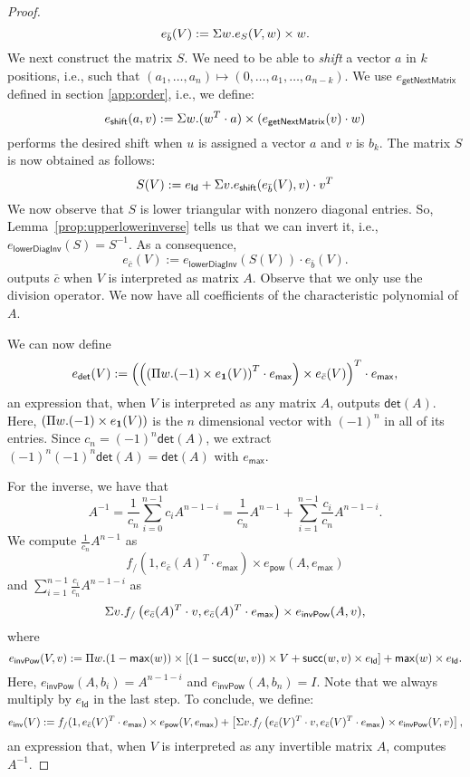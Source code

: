 \begin{proof}
$$
e_{\bar b}(V):=\Sigma w.e_{S}(V,w)\times w.
$$
We next construct the matrix $S$. We need to be able to \textit{shift} a vector $a$ in $k$ positions, i.e.,
such that $(a_1,\ldots,a_n)\mapsto (0,\ldots,a_1,\ldots,a_{n-k})$. We use $e_{\mathsf{getNextMatrix}}$ 
defined in section \ref{app:order}, i.e., we define:
$$
e_{\mathsf{shift}}(a,v):=\Sigma w.(w^T\cdot a)\times(e_{\mathsf{getNextMatrix}}(v)\cdot w)
$$
performs the desired shift when $u$ is assigned a vector $a$ and $v$ is $b_k$. 
The matrix $S$ is now obtained as follows:
$$
S(V):= e_{\mathsf{Id}} + \Sigma v. e_{\mathsf{shift}}(e_{\bar b}(V), v)\cdot v^T
$$
We now observe that $S$ is lower triangular with nonzero diagonal entries. So,
Lemma~\ref{prop:upperlowerinverse} tells us that we can invert it, i.e.,
$e_{\mathsf{lowerDiagInv}}(S)=S^{-1}$. As a consequence,
$$
e_{\bar c}(V):=e_{\mathsf{lowerDiagInv}}(S(V))\cdot e_{\bar b}(V).
$$
outputs $\bar c$ when $V$ is interpreted as matrix $A$. Observe that we only use the division operator. We now have all coefficients of the characteristic polynomial of $A$.


We can now define
$$
e_{\mathsf{det}}(V):=\left( \left(\left( \Pi w. (-1)\times e_{\mathbf{1}}(V)\right)^T\cdot e_{\mathsf{max}}\right) \times e_{\bar c}(V) \right)^T\cdot e_{\mathsf{max}},
$$
an expression that, when $V$ is interpreted as any matrix $A$, outputs $\mathsf{det}(A)$.
Here, $(\Pi w. (-1)\times e_{\mathbf{1}}(V))$ is the $n$ dimensional vector with $(-1)^n$ in all of its entries.
Since $c_n=(-1)^n\mathsf{det}(A)$, we extract $(-1)^n(-1)^n\mathsf{det}(A)=\mathsf{det}(A)$ with $e_{\mathsf{max}}$.

For the inverse, we have that
$$
A^{-1}=\frac{1}{c_n}\sum_{i=0}^{n-1}c_i A^{n-1-i} = \frac{1}{c_n}A^{n-1} + \sum_{i=1}^{n-1}\frac{c_i}{c_n}A^{n-1-i}.
$$
We compute $\frac{1}{c_n}A^{n-1}$ as
$$
f_{/}(1, e_{\bar c}(A)^T\cdot e_{\mathsf{max}})\times e_{\mathsf{pow}}(A, e_{\mathsf{max}})
$$
and $\sum_{i=1}^{n-1}\frac{c_i}{c_n}A^{n-1-i}$ as
$$
\Sigma v. f_{/}\left( e_{\bar c}(A)^T\cdot v, e_{\bar c}(A)^T\cdot e_{\mathsf{max}} \right)\times e_{\mathsf{invPow}}(A, v),
$$
where
$$
e_{\mathsf{invPow}}(V, v):= \Pi w. (1-\mathsf{max}(w)) \times \left[ (1 - \mathsf{succ}(w,v))\times V + \mathsf{succ}(w,v)\times e_{\mathsf{Id}} \right] + \mathsf{max}(w)\times e_{\mathsf{Id}}.
$$
Here, $e_{\mathsf{invPow}}(A, b_i)=A^{n-1-i}$ and $e_{\mathsf{invPow}}(A, b_n)=I$.
Note that we always multiply by $e_{\mathsf{Id}}$ in the last step.
To conclude, we define:
$$
e_{\mathsf{inv}}(V):= f_{/}(1, e_{\bar c}(V)^T\cdot e_{\mathsf{max}})\times e_{\mathsf{pow}}(V, e_{\mathsf{max}}) + \left[ \Sigma v. f_{/}\left( e_{\bar c}(V)^T\cdot v, e_{\bar c}(V)^T\cdot e_{\mathsf{max}} \right)\times e_{\mathsf{invPow}}(V, v) \right],
$$
an expression that, when $V$ is interpreted as any invertible matrix $A$, computes $A^{-1}$.
\end{proof}


